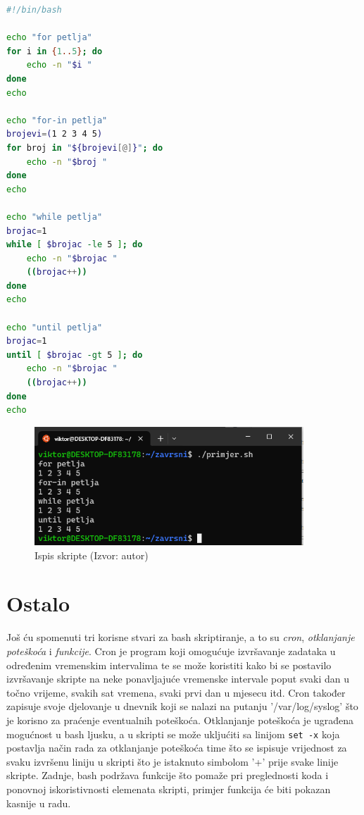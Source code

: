 \documentclass{foi}
\begin{document}
\begin{lstlisting}[language=bash]
#!/bin/bash

echo "for petlja"
for i in {1..5}; do
    echo -n "$i "
done
echo

echo "for-in petlja"
brojevi=(1 2 3 4 5)
for broj in "${brojevi[@]}"; do
    echo -n "$broj "
done
echo

echo "while petlja"
brojac=1
while [ $brojac -le 5 ]; do
    echo -n "$brojac "
    ((brojac++))
done
echo

echo "until petlja"
brojac=1
until [ $brojac -gt 5 ]; do
    echo -n "$brojac "
    ((brojac++))
done
echo
\end{lstlisting}
\begin{figure}[H]
    \centering
    \includegraphics[width=0.9\textwidth]{slike/petlje.png}
    \caption{Ispis skripte (Izvor: autor)}
    \label{fig:petlje}
\end{figure}

\section{Ostalo}
Još ću spomenuti tri korisne stvari za bash skriptiranje, a to su \textit{cron}, \textit{otklanjanje poteškoća} i \textit{funkcije}. Cron je program koji omogućuje izvršavanje zadataka u određenim vremenskim intervalima te se može koristiti kako bi se postavilo izvršavanje skripte na neke ponavljajuće vremenske intervale poput svaki dan u točno vrijeme, svakih sat vremena, svaki prvi dan u mjesecu itd. Cron također zapisuje svoje djelovanje u dnevnik koji se nalazi na putanju '/var/log/syslog' što je korisno za praćenje eventualnih poteškoća. Otklanjanje poteškoća je ugrađena mogućnost u bash ljusku, a u skripti se može ukljućiti sa linijom \verb|set -x| koja postavlja način rada za otklanjanje poteškoća time što se ispisuje vrijednost za svaku izvršenu liniju u skripti što je istaknuto simbolom '+' prije svake linije skripte. Zadnje, bash podržava funkcije što pomaže pri preglednosti koda i ponovnoj iskoristivnosti elemenata skripti, primjer funkcija će biti pokazan kasnije u radu.
\end{document}
